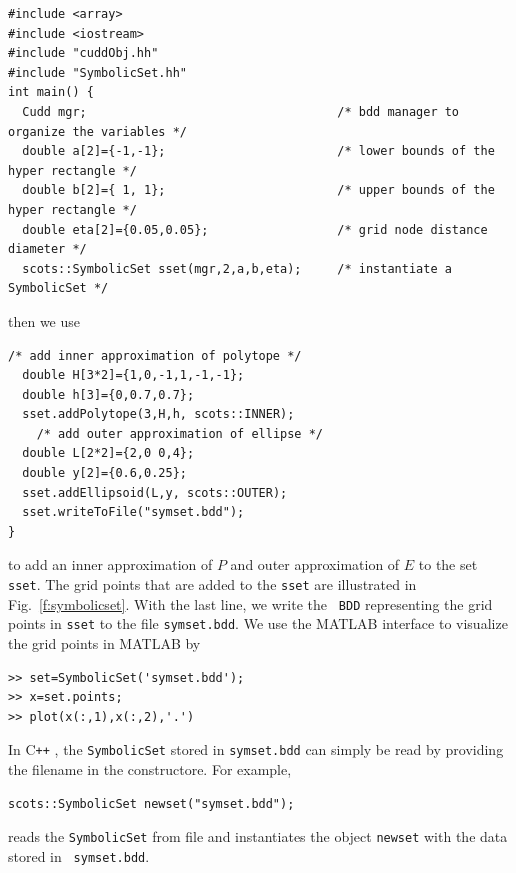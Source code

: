 \documentclass[a4paper]{amsart}
\newcommand\Cpp{C\texttt{++} }
\begin{document}
\begin{lstlisting}[basicstyle=\footnotesize\ttfamily]
#include <array>
#include <iostream>
#include "cuddObj.hh"
#include "SymbolicSet.hh"
int main() {
  Cudd mgr;                                   /* bdd manager to organize the variables */    
  double a[2]={-1,-1};                        /* lower bounds of the hyper rectangle */
  double b[2]={ 1, 1};                        /* upper bounds of the hyper rectangle */
  double eta[2]={0.05,0.05};                  /* grid node distance diameter */
  scots::SymbolicSet sset(mgr,2,a,b,eta);     /* instantiate a SymbolicSet */
\end{lstlisting}
then we use 
\begin{lstlisting}[basicstyle=\footnotesize\ttfamily]
	/* add inner approximation of polytope */
  double H[3*2]={1,0,-1,1,-1,-1};
  double h[3]={0,0.7,0.7};
  sset.addPolytope(3,H,h, scots::INNER);
	/* add outer approximation of ellipse */
  double L[2*2]={2,0 0,4};
  double y[2]={0.6,0.25};
  sset.addEllipsoid(L,y, scots::OUTER);
  sset.writeToFile("symset.bdd");
}
\end{lstlisting}
to add an inner approximation of $P$ and outer approximation of $E$ to the set
{\tt \small sset}. The grid points that are added to the {\tt \small sset} are
illustrated in Fig.~\ref{f:symbolicset}. With the last line, we write the {\tt
\small BDD} representing the grid points in {\tt\small sset} to the file
{\tt\small symset.bdd}. We use the MATLAB interface to visualize the grid points
in MATLAB by 
\begin{lstlisting}[basicstyle=\footnotesize\ttfamily]
>> set=SymbolicSet('symset.bdd');
>> x=set.points;
>> plot(x(:,1),x(:,2),'.')
\end{lstlisting}
In \Cpp, the {\tt\small SymbolicSet} stored in {\tt\small symset.bdd} can simply be read by providing the filename in the constructore. For example, 
\begin{lstlisting}[basicstyle=\footnotesize\ttfamily]
  scots::SymbolicSet newset("symset.bdd");
\end{lstlisting}
reads the {\tt\small SymbolicSet} from file and
instantiates the object {\tt\small newset} with the data stored in {\tt\small
symset.bdd}.
\end{document}
